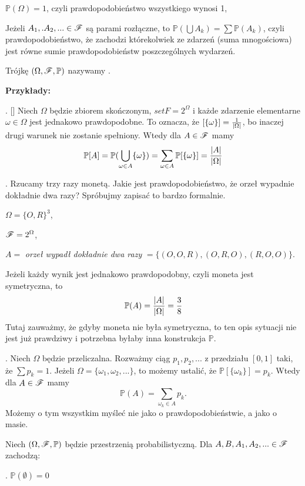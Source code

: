\documentclass{article}
\begin{document}
\indent \point $\mathbb{P}(\Omega)=1$, czyli prawdopodobieństwo wszystkiego wynosi 1,

\indent \point Jeżeli $A_1,.A_2,...\in\mathcal{F}$ są parami rozłączne, to $\mathbb{P}\left(\bigcup A_k\right)=\sum\mathbb{P}(A_k)$, czyli prawdopodobieństwo, że zachodzi którekolwiek ze zdarzeń (suma mnogościowa) jest równe sumie prawdopodobieństw poszczególnych wydarzeń.

Trójkę $(\Omega, \mathcal{F},\mathbb{P})$ nazywamy .
\medskip

\textbf{\large Przykłady:}

. [] Niech $\Omega$ będzie zbiorem skończonym, $set{F}=2^{\Omega}$ i każde zdarzenie elementarne $\omega\in\Omega$ jest jednakowo prawdopodobne. To oznacza, że $\mathbb[\{\omega\}]={1\over|\Omega|}$, bo inaczej drugi warunek nie zostanie spełniony. Wtedy dla $A\in \mathcal{F}$ mamy 
$$\mathbb{P}[A]=\mathbb{P}(\bigcup_{\omega\in A}\{\omega\})=\sum_{\omega\in A}\mathbb{P}[\{\omega\}]={|A|\over|\Omega|}$$

. Rzucamy trzy razy monetą. Jakie jest prawdopodobieństwo, że orzeł wypadnie dokładnie dwa razy? Spróbujmy zapisać to bardzo formalnie. 

$\Omega=\{O,R\}^3$,

$\mathcal{F}=2^\Omega$, 

$A=$\emph{ orzeł wypadł dokładnie dwa razy }$=\{(O, O, R), (O, R, O), (R, O, O)\}$.

Jeżeli każdy wynik jest jednakowo prawdopodobny, czyli moneta jest symetryczna, to
$$\mathbb{P}(A)={|A|\over|\Omega|}={3\over 8}$$
Tutaj zauważmy, że gdyby moneta nie była symetryczna, to ten opis sytuacji nie jest już prawdziwy i potrzebna byłaby inna konstrukcja $\mathbb{P}$.

. Niech $\Omega$ będzie przeliczalna. Rozważmy ciąg $p_1,p_2,...$ z przedziału $[0,1]$ taki, że $\sum p_k=1$. Jeżeli $\Omega=\{\omega_1,\omega_2,...\}$, to możemy ustalić, że $\mathbb{P}[\{\omega_k\}]=p_k$. Wtedy dla $A\in\mathcal{F}$ mamy
$$\mathbb{P}(A)=\sum_{\omega_k\in A}p_k.$$
Możemy o tym wszystkim myśleć nie jako o prawdopodobieństwie, a jako o masie.
\medskip

\medskip

 Niech $(\Omega,\mathcal{F},\mathbb{P})$ będzie przestrzenią probabilistyczną. Dla $A, B, A_1, A_2,...\in\mathcal{F}$ zachodzą:

. $\mathbb{P}(\emptyset)=0$
\end{document}
